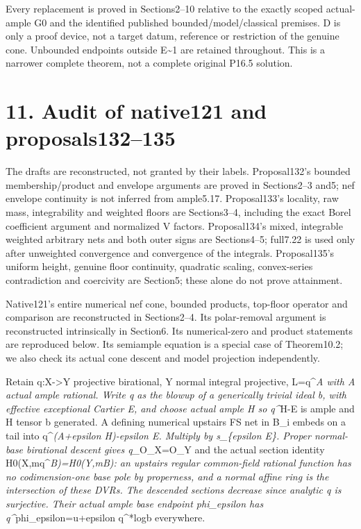 \documentclass[
  10pt,
]{article}
\begin{document}
Every replacement is proved in Sections2--10 relative to the exactly
scoped actual-ample G0 and the identified published
bounded/model/classical premises. D is only a proof device, not a target
datum, reference or restriction of the genuine cone. Unbounded endpoints
outside E\textasciitilde1 are retained throughout. This is a narrower
complete theorem, not a complete original P16.5 solution.

\section{11. Audit of native121 and
proposals132--135}\label{audit-of-native121-and-proposals132135}

The drafts are reconstructed, not granted by their labels. Proposal132's
bounded membership/product and envelope arguments are proved in
Sections2--3 and5; nef envelope continuity is not inferred from
ample5.17. Proposal133's locality, raw mass, integrability and weighted
floors are Sections3--4, including the exact Borel coefficient argument
and normalized V factors. Proposal134's mixed, integrable weighted
arbitrary nets and both outer signs are Sections4--5; full7.22 is used
only after unweighted convergence and convergence of the integrals.
Proposal135's uniform height, genuine floor continuity, quadratic
scaling, convex-series contradiction and coercivity are Section5; these
alone do not prove attainment.

Native121's entire numerical nef cone, bounded products, top-floor
operator and comparison are reconstructed in Sections2--4. Its
polar-removal argument is reconstructed intrinsically in Section6. Its
numerical-zero and product statements are reproduced below. Its
semiample equation is a special case of Theorem10.2; we also check its
actual cone descent and model projection independently.

Retain q:X-\textgreater Y projective birational, Y normal integral
projective, L=q\^{}\emph{A with A actual ample rational. Write q as the
blowup of a generically trivial ideal b, with effective exceptional
Cartier E, and choose actual ample H so q\^{}}H-E is ample and H tensor
b generated. A defining numerical upstairs FS net in B\_i embeds on a
tail into q\^{}\emph{(A+epsilon H)-epsilon E. Multiply by s\_\{epsilon
E\}. Proper normal-base birational descent gives q\_}O\_X=O\_Y and the
actual section identity H0(X,mq\^{}\emph{B)=H0(Y,mB): an upstairs
regular common-field rational function has no codimension-one base pole
by properness, and a normal affine ring is the intersection of these
DVRs. The descended sections decrease since analytic q is surjective.
Their actual ample base endpoint phi\_epsilon has
q\^{}}phi\_epsilon=u+epsilon q\^{}*log\textbar b\textbar{} everywhere.
\end{document}

